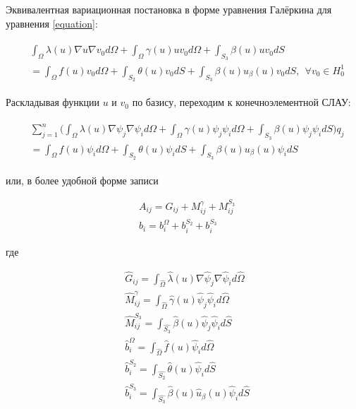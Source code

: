 \documentclass[12pt]{article}
\begin{document}
\noindent Эквивалентная вариационная постановка в форме уравнения Галёркина для
уравнения \ref{equation}:

\begin{align}
  \begin{split}
    &\int_{\Omega}\lambda(u)\nabla u \nabla v_0 d\Omega +
    \int_{\Omega}\gamma(u)uv_0 d\Omega +
    \int_{S_3}\beta(u)uv_0 dS \\
    &= \int_{\Omega}f(u)v_0 d\Omega +
    \int_{S_2}\theta(u)v_0 dS +
    \int_{S_3}\beta(u)u_{\beta}(u)v_0 dS, \ \ \forall v_0 \in H_0^1
  \end{split}
\end{align}

\vskip 5mm
\noindent Раскладывая функции $u$ и $v_0$ по базису, переходим 
к конечноэлементной СЛАУ:

\begin{align}
  \begin{split}
    &\sum_{j=1}^{n}\big(
      \int_{\Omega}\lambda(u)\nabla \psi_j \nabla \psi_i d\Omega +
      \int_{\Omega}\gamma(u) \psi_j \psi_i d\Omega +
      \int_{S_3}\beta(u) \psi_j \psi_i dS
    \big)q_j \\
    &= \int_{\Omega}f(u) \psi_i d\Omega +
    \int_{S_2}\theta(u) \psi_i dS +
    \int_{S_3}\beta(u)u_{\beta}(u) \psi_i dS
  \end{split}
\end{align}

\vskip 5mm
\noindent или, в более удобной форме записи

\begin{align*}
  &A_{ij} = G_{ij} + M^{\gamma}_{ij} + M^{S_3}_{ij} \\
  &b_{i} = b^{\Omega}_{i} + b^{S_2}_{i} + b^{S_3}_{i}
\end{align*}

\vskip 5mm
\noindent где

\begin{align}
  &\hat{G}_{ij} = \int_{\hat{\Omega}}\hat{\lambda}(u)\nabla\hat{\psi}_j\nabla\hat{\psi}_i d\hat{\Omega} \\
  &\hat{M}^{\gamma}_{ij} = \int_{\hat{\Omega}}\hat{\gamma}(u)\hat{\psi}_j\hat{\psi}_i d\hat{\Omega} \\
  &\hat{M}^{S_3}_{ij} = \int_{\hat{S_3}}\hat{\beta}(u)\hat{\psi}_j\hat{\psi}_i d\hat{S} \\
  &\hat{b}^{\Omega}_{i} = \int_{\hat{\Omega}}\hat{f}(u)\hat{\psi}_i d\hat{\Omega} \\
  &\hat{b}^{S_2}_{i} = \int_{\hat{S_2}}\hat{\theta}(u)\hat{\psi}_i d\hat{S} \\
  &\hat{b}^{S_3}_{i} = \int_{\hat{S_3}}\hat{\beta}(u)\hat{u}_{\beta}(u)\hat{\psi}_i d\hat{S}
\end{align}
\end{document}
